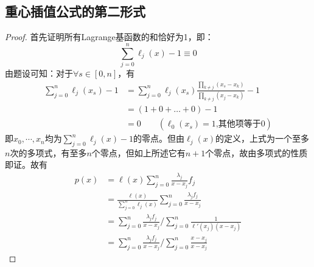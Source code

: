 \documentclass[]{report}
\begin{document}
		\subsection{重心插值公式的第二形式}
		\begin{proof}
			首先证明所有Lagrange基函数的和恰好为1，即：
			\[\sum_{j=0}^n\ell_j(x)-1\equiv0\]
			由题设可知：对于$\forall s\in[0,n]$，有
			\[\begin{aligned}
				\sum_{j=0}^n\ell_j(x_s)-1
				&=\sum_{j=0}^n\ell_j(x_s)\frac{\prod_{k\neq j}(x_s-x_k)}{\prod_{k\neq j}(x_j-x_k)}-1\\
				&=(1+0+\dots+0)-1\\
				&=0\qquad(\ell_0(x_s)=1\mbox{,其他项等于0})
			\end{aligned}\]
			即$x_0,\cdots,x_n$均为$\displaystyle\sum_{j=0}^n\ell_j(x)-1$的零点。但由$\ell_j(x)$的定义，上式为一个至多$n$次的多项式，有至多$n$个零点，但如上所述它有$n+1$个零点，故由多项式的性质即证。故有
			\[\begin{aligned}
				p(x)&=\ell(x)\sum_{j=0}^n\frac{\lambda_j}{x-x_j}f_j\\
				&=\frac{\ell(x)}{\sum_{j=0}^n\ell_j(x)}\sum_{j=0}^n\frac{\lambda_jf_j}{x-x_j}\\
				&=\sum_{j=0}^n\frac{\lambda_jf_j}{x-x_j}/\sum_{j=0}^n\frac{1}{\ell'(x_j)(x-x_j)}\\
				&=\sum_{j=0}^n\frac{\lambda_jf_j}{x-x_j}/\sum_{j=0}^n\frac{x-x_j}{x-x_j}
			\end{aligned}\]
		\end{proof}
\end{document}
